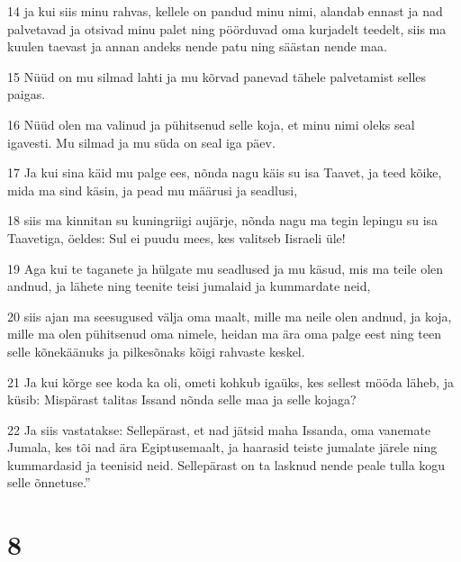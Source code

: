 \par 14 ja kui siis minu rahvas, kellele on pandud minu nimi, alandab ennast ja nad palvetavad ja otsivad minu palet ning pöörduvad oma kurjadelt teedelt, siis ma kuulen taevast ja annan andeks nende patu ning säästan nende maa.
\par 15 Nüüd on mu silmad lahti ja mu kõrvad panevad tähele palvetamist selles paigas.
\par 16 Nüüd olen ma valinud ja pühitsenud selle koja, et minu nimi oleks seal igavesti. Mu silmad ja mu süda on seal iga päev.
\par 17 Ja kui sina käid mu palge ees, nõnda nagu käis su isa Taavet, ja teed kõike, mida ma sind käsin, ja pead mu määrusi ja seadlusi,
\par 18 siis ma kinnitan su kuningriigi aujärje, nõnda nagu ma tegin lepingu su isa Taavetiga, öeldes: Sul ei puudu mees, kes valitseb Iisraeli üle!
\par 19 Aga kui te taganete ja hülgate mu seadlused ja mu käsud, mis ma teile olen andnud, ja lähete ning teenite teisi jumalaid ja kummardate neid,
\par 20 siis ajan ma seesugused välja oma maalt, mille ma neile olen andnud, ja koja, mille ma olen pühitsenud oma nimele, heidan ma ära oma palge eest ning teen selle kõnekäänuks ja pilkesõnaks kõigi rahvaste keskel.
\par 21 Ja kui kõrge see koda ka oli, ometi kohkub igaüks, kes sellest mööda läheb, ja küsib: Mispärast talitas Issand nõnda selle maa ja selle kojaga?
\par 22 Ja siis vastatakse: Sellepärast, et nad jätsid maha Issanda, oma vanemate Jumala, kes tõi nad ära Egiptusemaalt, ja haarasid teiste jumalate järele ning kummardasid ja teenisid neid. Sellepärast on ta lasknud nende peale tulla kogu selle õnnetuse.”

\chapter{8}

